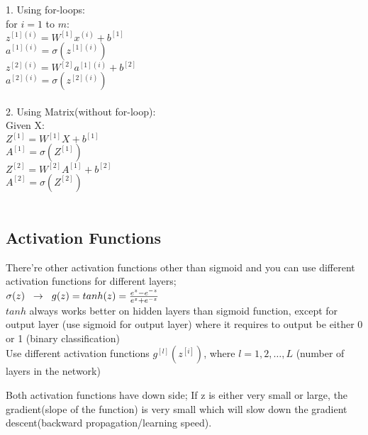 \documentclass{article}
\begin{document}
1. Using for-loops:\\

for $i=1$  to $m$:\\

$z^{[1](i)} = W^{[1]} x^{(i)} + b^{[1]}$\\

$a^{[1](i)} = \sigma(z^{[1](i)})$\\

$z^{[2](i)} = W^{[2]}a^{[1](i)} + b^{[2]}$\\

$a^{[2](i)} = \sigma(z^{[2](i)})$\\\\

2. Using Matrix(without for-loop): \\

Given X:\\

$Z^{[1]} = W^{[1]} X + b^{[1]}$\\

$A^{[1]} = \sigma(Z^{[1]})$\\

$Z^{[2]} = W^{[2]}A^{[1]} + b^{[2]}$\\

$A^{[2]} = \sigma(Z^{[2]})$\\\\



\newpage
\subsection{Activation Functions}

There're other activation functions other than sigmoid and you can use different activation functions for different layers; \\
$\sigma(z) \hspace{2mm} \rightarrow\hspace{2mm} g(z) = tanh(z) = \frac{e^{z} - e^{-z}}{e^{z}+e^{-z}}$\\

$tanh$ always works better on hidden layers than sigmoid function, except for output layer (use sigmoid for output layer) where it requires to output be either 0 or 1 (binary classification)\\


Use different activation functions $g^{[l]}(z^{[i]})$, where $l=1,2, \dots, L$ (number of layers in the network)


Both activation functions have down side; If z is either very small or large, the gradient(slope of the function) is very small which will slow down the gradient descent(backward propagation/learning speed).\\
\end{document}
